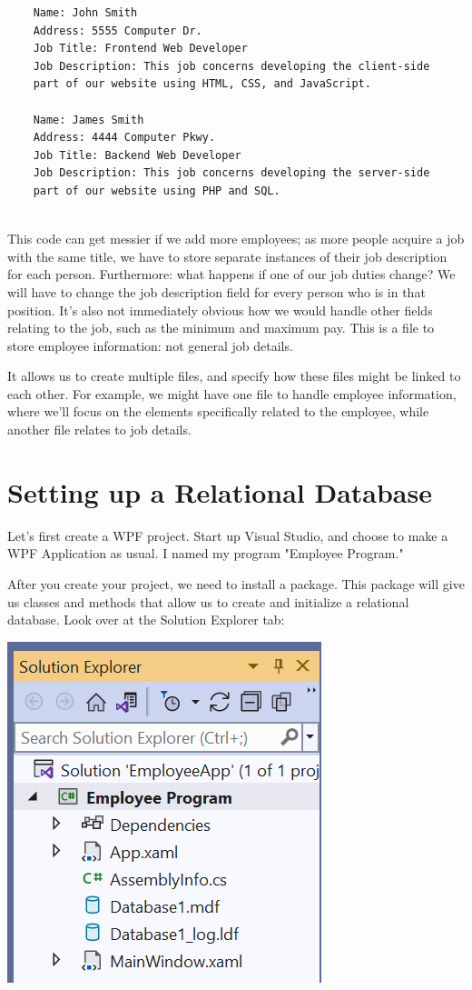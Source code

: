 \documentclass[oneside, openany] {book}
\begin{document}
\begin{verbatim}
    Name: John Smith
    Address: 5555 Computer Dr.
    Job Title: Frontend Web Developer
    Job Description: This job concerns developing the client-side
    part of our website using HTML, CSS, and JavaScript.
    
    Name: James Smith
    Address: 4444 Computer Pkwy.
    Job Title: Backend Web Developer
    Job Description: This job concerns developing the server-side 
    part of our website using PHP and SQL.
    
\end{verbatim}
This code can get messier if we add more employees; as more people acquire a job with the same title, we have to store separate instances of their job description for each person. Furthermore: what happens if one of our job duties change? We will have to change the job description field for every person who is in that position. It's also not immediately obvious how we would handle other fields relating to the job, such as the minimum and maximum pay. This is a file to store employee information: not general job details.

It allows us to create multiple files, and specify how these files might be linked to each other. For example, we might have one file to handle employee information, where we'll focus on the elements specifically related to the employee, while another file relates to job details.

\section{Setting up a Relational Database}

Let's first create a WPF project. Start up Visual Studio, and choose to make a WPF Application as usual. I named my program "Employee Program."

After you create your project, we need to install a package. This package will give us classes and methods that allow us to create and initialize a relational database. Look over at the Solution Explorer tab:

\includegraphics[scale=0.5]{EmployeeProgram}
\end{document}
